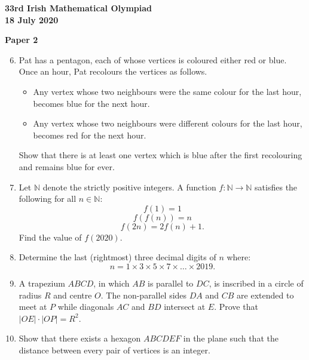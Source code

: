 \documentclass[12pt]{article}
\begin{document}
\newpage
\begin{center}
{\large\bfseries 33rd Irish Mathematical Olympiad\\18 July 2020}
\end{center}
\bigskip\noindent\textbf{Paper 2}\bigskip
\begin{enumerate}
\setcounter{enumi}{5}
\item Pat has a pentagon, each of whose vertices is coloured either red or blue. Once an hour, Pat recolours the vertices as follows.
\begin{itemize}
\item Any vertex whose two neighbours were the same colour for the last hour, becomes blue for the next hour.
\item Any vertex whose two neighbours were different colours for the last hour, becomes red for the next hour.
\end{itemize}
Show that there is at least one vertex which is blue after the first recolouring and remains blue for ever.

\item Let $\mathbb{N}$ denote the strictly positive integers. A function $f : \mathbb{N} \to \mathbb{N}$ satisfies the following for all $n \in \mathbb{N}$:
\[
f(1) = 1
\]
\[
f(f(n)) = n
\]
\[
f(2n) = 2f(n) + 1.
\]
Find the value of $f(2020)$.

\item Determine the last (rightmost) three decimal digits of $n$ where:
\[
n = 1 \times 3 \times 5 \times 7 \times \ldots \times 2019.
\]

\item A trapezium $ABCD$, in which $AB$ is parallel to $DC$, is inscribed in a circle of radius $R$ and centre $O$. The non-parallel sides $DA$ and $CB$ are extended to meet at $P$ while diagonals $AC$ and $BD$ intersect at $E$. Prove that $|OE| \cdot |OP| = R^2$.

\item Show that there exists a hexagon $ABCDEF$ in the plane such that the distance between every pair of vertices is an integer.
\end{enumerate}
\end{document}
